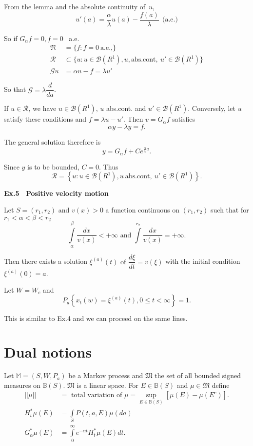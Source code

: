 From the lemma and the absolute continuity of\ $u$, 
$$
u'(a) = \frac{\alpha}{\lambda} u(a) - \frac{f(a)}{\lambda}\ \ \text{(a.e.)}
$$\pageoriginale

So if $G_\alpha f = 0, f = 0$ \ a.e. 
\begin{align*}
  \mathfrak{N} & = \Big\{ f : f = 0 ~\text{a.e.,}\Big\}\\
  \mathscr{R} & \subset \{ u : u \in \mathscr{B} (R^1) , u , \text{abs.cont},\
  u' \in \mathscr{B} (R^1)\} \\ 
  \mathscr{G} u & = \alpha u - f =\lambda u' 
\end{align*}

So that $\mathscr{G} = \lambda \dfrac{d}{da}$. 

If $u \in \mathscr{R}$, we have $u \in \mathscr{B}(R^1)$, $u$
abs.cont. and $u' \in\mathscr{B}(R^1)$. Conversely, let $u$ satisfy
these conditions and $f = \lambda u - u'$. Then $v = G_\alpha f$ satisfies  
$$
\alpha y - \lambda y = f. 
$$

The general solution therefore is 
$$
y = G_\alpha f + C e ^{ \frac{\alpha}{\lambda}a}.
$$

Since $y$ is to be bounded, $C = 0$. Thus 
$$
\mathscr{R} = \left\{ u : u \in \mathscr{B} (R^1), u \ \text{abs.cont},\ u ' \in
\mathscr{B}(R^1) \right\}. 
$$

\medskip
\noindent
{\bf Ex.5~ Positive velocity motion}
\smallskip

Let $S = (r_1 , r_2)$ and $v(x) > 0$ a function continuous on $(r_1,
r_2)$ such that for $r_1 < \alpha < \beta < r_2$ 
$$
\int\limits^ \beta_\alpha \frac{dx}{v(x)}<  + \infty \text{ \ and \ }
\int\limits^{r_2} \frac{dx}{v(x)} = + \infty.  
$$\pageoriginale

Then there exists a solution $\xi ^{(a)}(t) \text{ of } \dfrac{d
  \xi}{dt} = v (\xi )$ with the initial condition $\xi ^{(a)} (0) =
a$.  

Let $W = W_c$ and 
$$
P_a \left\{ x_t (w) = \xi ^{(a)} (t), 0 \leq t < \infty \right\} = 1. 
$$

This is similar to Ex.4 and we can proceed on the same lines. 

\section{Dual notions}\label{chap1-sec8}

Let $\mathbb{M}= (S, W, P_a)$ be a Markov process and $\mathfrak{M}$
the set of all bounded signed measures on
$\mathbb{B}(S)$. $\mathfrak{M}$ is a linear space. For
$E\in\mathbb{B}(S)$ and $\mu \in \mathfrak{M}$ define  
\begin{align*}
  || \mu || & = \text{ total variation of }\mu = \sup_{E \in
    \mathbb{B}(S)}[\mu(E) - \mu (E^c)].\\ 
  H^*_t \mu (E) & =  \int\limits_S P(t, a, E) \mu (da) \\
  G^*_\alpha \mu(E) & = \int\limits^\infty_0  e^{ - \alpha t} H^*_t \mu (E) dt. 
\end{align*}
 
